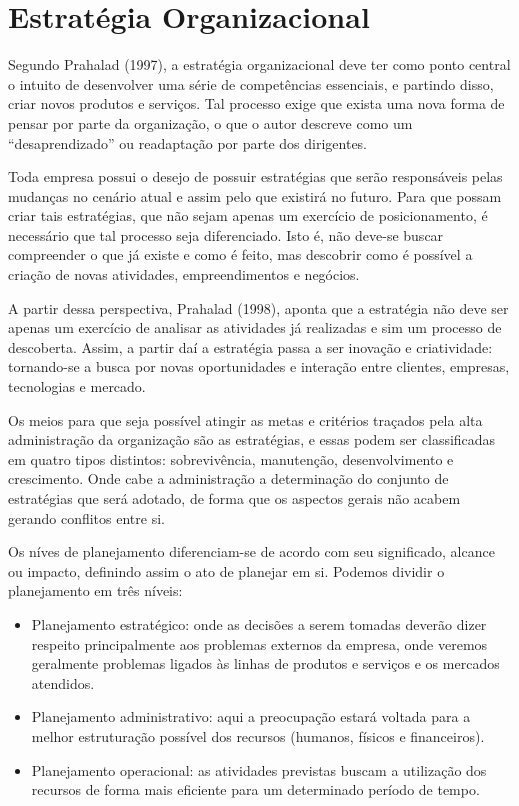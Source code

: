 \documentclass[12pt,a4paper,ruledheader,tocpage=prefix,floatnumber=continuous,pagestart=folhaderosto,font=times]{abnt}
\begin{document}
\chapter{Estratégia Organizacional}
Segundo Prahalad (1997), a estratégia organizacional deve ter como ponto central o intuito de desenvolver uma série de competências essenciais, e partindo
disso, criar novos produtos e serviços. Tal processo exige que exista uma nova forma de pensar por parte da organização, o que o autor descreve como um
``desaprendizado'' ou readaptação por parte dos dirigentes. 

Toda empresa possui o desejo de possuir estratégias que serão responsáveis pelas mudanças no cenário atual e assim pelo que existirá no futuro. Para que possam
criar tais estratégias, que não sejam apenas um exercício de posicionamento, é necessário que tal processo seja diferenciado. Isto é, não deve-se buscar 
compreender o que já existe e como é feito, mas descobrir como é possível a criação de novas atividades, empreendimentos e negócios. 

A partir dessa perspectiva, Prahalad (1998), aponta que a estratégia não deve ser apenas um exercício de analisar as atividades já realizadas e sim um processo
de descoberta. Assim, a partir daí a estratégia passa a ser inovação e criatividade: tornando-se a busca por novas oportunidades e interação entre clientes, 
empresas, tecnologias e mercado.

Os meios para que seja possível atingir as metas e critérios traçados pela alta administração da organização são as estratégias, e essas
podem ser classificadas em quatro tipos distintos: sobrevivência, manutenção, desenvolvimento e crescimento. Onde cabe a administração a determinação do conjunto
de estratégias que será adotado, de forma que os aspectos gerais não acabem gerando conflitos entre si.

Os níves de planejamento diferenciam-se de acordo com seu significado, alcance ou impacto, definindo assim o ato de planejar em si. Podemos dividir o 
planejamento em três níveis\cite{sanvicente}:

\begin{itemize}
 \item Planejamento estratégico: onde as decisões a serem tomadas deverão dizer respeito principalmente aos problemas externos da empresa, onde veremos geralmente
       problemas ligados às linhas de produtos e serviços e os mercados atendidos.
 \item Planejamento administrativo: aqui a preocupação estará voltada para a melhor estruturação possível dos recursos (humanos, físicos e financeiros).
 \item Planejamento operacional: as atividades previstas buscam a utilização dos recursos de forma mais eficiente para um determinado período de tempo.
\end{itemize}
\end{document}
